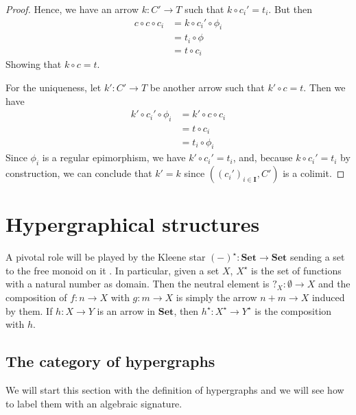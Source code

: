 \documentclass[runningheads,envcountsect]{llncs}
\newcommand{\cat}[1]{\ensuremath{\mathbf{#1}}}
\newcommand{\Set}{\mathbf{Set}}
\begin{document}
\begin{proof}
    Hence, we have an arrow $k: C' \to T$ such that $k \circ c_i' = t_i$. But then
    \begin{align*}
        c \circ c \circ c_i &= k \circ c_i' \circ \phi_i \\
                            &= t_i \circ \phi \\
                            &= t \circ c_i
    \end{align*}
    Showing that $k \circ c = t$.

    For the uniqueness, let $k': C' \to T$ be another arrow such that $k' \circ c = t$. Then we have
    \begin{align*}
        k' \circ c_i' \circ \phi_i &= k' \circ c \circ c_i \\
                                   &= t \circ c_i \\
                                   &= t_i \circ \phi_i
    \end{align*}    
    Since $\phi_i$ is a regular epimorphism, we have $k' \circ c_i' = t_i$, and, because $k \circ c_i' = t_i$ by construction, we can conclude that $k'=k$ since $((c_i')_{i \in \cat I}, C')$ is a colimit.
\end{proof}




\section{Hypergraphical structures}\label{sec:hyper}


A pivotal role will be played by the Kleene star $(-)^\star\colon \Set\to \Set$ sending a set to the free monoid on it \cite{...}. In particular, given a set $X$, $X^\star$ is the set of functions with a natural number as domain. Then the neutral element is $?_X\colon \emptyset \to X$ and the composition of $f\colon n\to X$ with $g\colon m\to X$ is simply the arrow $n+m\to X$ induced by them. If $h\colon X\to Y$ is an arrow in $\Set$, then $h^\star \colon X^\star\to Y^\star$ is the composition with $h$.

\subsection{The category of hypergraphs}


We will start this section with the definition of hypergraphs and we will see how to label them with an algebraic signature. 
\end{document}
